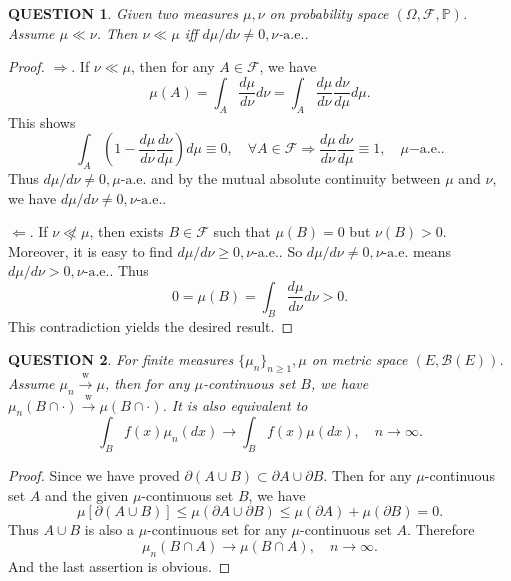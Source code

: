 \documentclass[12pt]{article}
\renewcommand{\b}{\mathscr{B}}
\renewcommand{\(}{\left(}%
\renewcommand{\)}{\right)}%
\renewcommand{\[}{\left[}%
\renewcommand{\]}{\right]}%
\newcommand{\p}{\mathbb{P}}
\newcommand{\f}{\mathscr{F}}
\newtheorem{question}{QUESTION}[section]}
\newtheorem{proof}{Proof.}}
\begin{document}
   \begin{question}
   	Given two measures $\mu,\nu$ on probability space $(\Omega,\f,\p)$. Assume $\mu\ll\nu$. Then $\nu\ll\mu$ iff $d\mu/d\nu\neq 0,\nu$-$\mathrm{a.e.}$.
   \end{question}
   \begin{proof}
   	$\Rightarrow$. If $\nu\ll\mu$, then for any $A\in\f$, we have
   	\begin{equation*}
   		\mu(A)=\int_A\frac{d\mu}{d\nu}d\nu=\int_A\frac{d\mu}{d\nu}\frac{d\nu}{d\mu}d\mu.
   	\end{equation*}
   	This shows 
   	\begin{equation*}
   		\int_A\(1-\frac{d\mu}{d\nu}\frac{d\nu}{d\mu}\)d\mu\equiv 0,\quad \forall A\in\f\Longrightarrow \frac{d\mu}{d\nu}\frac{d\nu}{d\mu}\equiv 1,\quad \mu\mathrm{-a.e.}.
   	\end{equation*}
   	Thus $d\mu/d\nu\neq 0,\mu\text{-a.e.}$ and by the mutual absolute continuity between $\mu$ and $\nu$, we have $d\mu/d\nu\neq 0,\nu\text{-a.e.}$.
   	
   	$\Leftarrow$. If $\nu\not\ll\mu$, then exists $B\in\f$ such that $\mu(B)=0$ but $\nu(B)>0$. Moreover, it is easy to find $d\mu/d\nu\geq 0,\nu$-$\mathrm{a.e.}$. So $d\mu/d\nu\neq 0,\nu$-$\mathrm{a.e.}$ means $d\mu/d\nu> 0,\nu$-$\mathrm{a.e.}$. Thus
   	\begin{equation*}
   		0=\mu(B)=\int_B\frac{d\mu}{d\nu}d\nu>0.
   	\end{equation*}
   	This contradiction yields the desired result.
   \end{proof}
   
   \begin{question}
   	For finite measures $\{\mu_n\}_{n\geq 1},\mu$ on metric space $(E,\b(E))$. Assume $\mu_n\overset{\mathrm{w}}{\to}\mu$, then for any $\mu$-continuous set $B$, we have $\mu_n(B\cap \cdot)\overset{\mathrm{w}}{\to}\mu(B\cap \cdot)$. It is also equivalent to
   	\begin{equation*}
   		\int_B f(x)\mu_n(dx)\to \int_Bf(x)\mu(dx),\quad n\to\infty.
   	\end{equation*}
   \end{question}
   \begin{proof}
   	Since we have proved $\partial(A\cup B)\subset\partial A\cup\partial B$. Then for any $\mu$-continuous set $A$ and the given $\mu$-continuous set $B$, we have
   	\begin{equation*}
   		\mu[\partial (A\cup B)]\leq \mu(\partial A\cup\partial B)\leq \mu(\partial A)+\mu(\partial B)=0.
   	\end{equation*}
   	Thus $A\cup B$ is also a $\mu$-continuous set for any $\mu$-continuous set $A$. Therefore 
   	\begin{equation*}
   		\mu_n(B\cap A)\to \mu(B\cap A),\quad n\to\infty.
   	\end{equation*}
   	And the last assertion is obvious.
   \end{proof}
   
\end{document}
